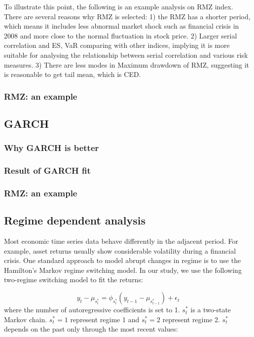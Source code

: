 \documentclass[11pt]{article}
\begin{document}
To illustrate this point, the following is an example analysis on RMZ index. There are several reasons why RMZ is selected: 1) the RMZ has a shorter period, which means it includes less abnormal market shock such as financial crisis in 2008 and more close to the normal fluctuation in stock price. 2) Larger serial correlation and ES, VaR comparing with other indices, implying it is more suitable for analysing the relationship between serial correlation and various risk measures. 3) There are less modes in Maximum drawdown of RMZ, suggesting it is reasonable to get tail mean, which is CED.
\subsubsection{RMZ: an example}

\subsection{GARCH}
\subsubsection{Why GARCH is better}
\subsubsection{Result of GARCH fit}
\subsubsection{RMZ: an example}

\subsection{Regime dependent analysis}

Most economic time series data behave differently in the adjacent period. For example, asset returns
usually show considerable volatility during a financial crisis. One standard approach to model abrupt changes in regime is to use the Hamilton's Markov regime switching model\cite{hamilton1994time}\cite{hamilton1990analysis}. In our study, we use the following two-regime switching model to fit the returns:

\begin{equation}
y_t - \mu_{s^*_t} = \phi_{s^*_t} (y_{t-1} - \mu_{s^*_{t-1}}) + \epsilon_t
\end{equation}
where the number of autoregressive coefficients is set to 1. $s^*_t$ is a two-state Markov chain. $s^*_t = 1$ represent regime 1 and $s^*_t = 2$ represent regime 2. $s^*_t$ depends on the past only through the most recent values:
\end{document}
